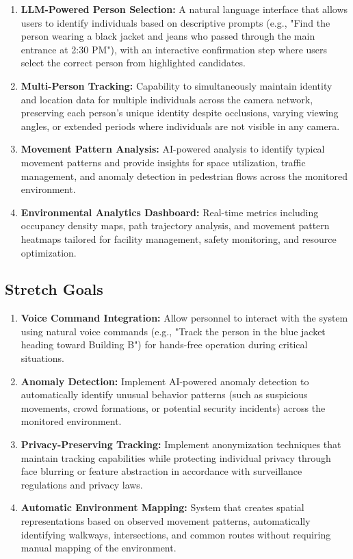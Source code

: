 \begin{enumerate}[leftmargin=80pt]
    \item \textbf{LLM-Powered Person Selection:} A natural language interface that allows users to identify individuals based on descriptive prompts (e.g., "Find the person wearing a black jacket and jeans who passed through the main entrance at 2:30 PM"), with an interactive confirmation step where users select the correct person from highlighted candidates.

    \item \textbf{Multi-Person Tracking:} Capability to simultaneously maintain identity and location data for multiple individuals across the camera network, preserving each person's unique identity despite occlusions, varying viewing angles, or extended periods where individuals are not visible in any camera.

    \item \textbf{Movement Pattern Analysis:} AI-powered analysis to identify typical movement patterns and provide insights for space utilization, traffic management, and anomaly detection in pedestrian flows across the monitored environment.

    \item \textbf{Environmental Analytics Dashboard:} Real-time metrics including occupancy density maps, path trajectory analysis, and movement pattern heatmaps tailored for facility management, safety monitoring, and resource optimization.
\end{enumerate}

\subsection{Stretch Goals}
\label{subsection:stretch-goals}

\begin{enumerate}[leftmargin=80pt]
    \item \textbf{Voice Command Integration:} Allow personnel to interact with the system using natural voice commands (e.g., "Track the person in the blue jacket heading toward Building B") for hands-free operation during critical situations.

    \item \textbf{Anomaly Detection:} Implement AI-powered anomaly detection to automatically identify unusual behavior patterns (such as suspicious movements, crowd formations, or potential security incidents) across the monitored environment.

    \item \textbf{Privacy-Preserving Tracking:} Implement anonymization techniques that maintain tracking capabilities while protecting individual privacy through face blurring or feature abstraction in accordance with surveillance regulations and privacy laws.

    \item \textbf{Automatic Environment Mapping:} System that creates spatial representations based on observed movement patterns, automatically identifying walkways, intersections, and common routes without requiring manual mapping of the environment.
\end{enumerate}

